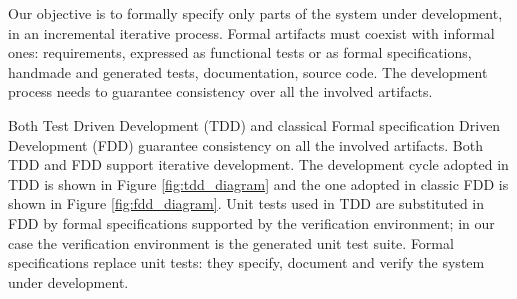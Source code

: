\documentclass[english]{lni}
\begin{document}
Our objective is to formally specify only parts of the system under development, in an incremental iterative process.
Formal artifacts must coexist with informal ones: requirements, expressed as functional tests or as formal specifications, handmade and generated tests, documentation, source code.
The development process needs to guarantee consistency over all the involved artifacts.

Both Test Driven Development (TDD) and classical Formal specification Driven Development (FDD) guarantee consistency on all the involved artifacts. 
Both TDD and FDD support iterative development.
The development cycle adopted in TDD is shown in Figure \ref{fig:tdd_diagram} and the one adopted in classic FDD is shown in Figure \ref{fig:fdd_diagram}.
Unit tests used in TDD are substituted  in FDD by formal specifications supported by the verification environment; in our case the verification environment is the generated unit test suite.
Formal specifications replace unit tests: they specify, document and verify the system under development.
\end{document}
